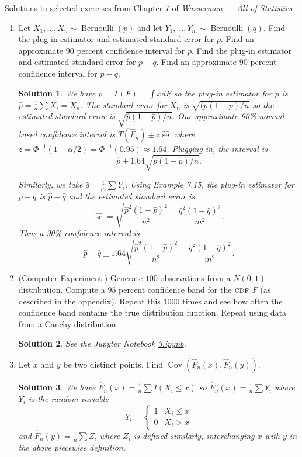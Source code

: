 \documentclass[10pt]{article}
\newtheorem*{sol}{Solution}
\newcommand{\Bern}{\operatorname{Bernoulli}}
\newcommand{\se}{\operatorname{se}}
\newcommand{\Cov}{\operatorname{Cov}}
\newcommand{\CDF}{\textsc{cdf}}
\begin{document}
\noindent \large{Solutions to selected exercises from Chapter 7 of
\emph{Wasserman --- All of Statistics}}

\begin{enumerate}
\item[(2)] Let $X_1,\ldots,X_n \sim \Bern(p)$ and let
$Y_1, \ldots, Y_m \sim \Bern(q)$. Find
the plug-in estimator and estimated standard error for $p$. Find an approximate
90 percent confidence interval for $p$. Find the plug-in estimator
and estimated standard error for $p - q$. Find an approximate 90
percent confidence interval for $p - q$.

\begin{sol}
We have $p=T(F)=\int xdF$ so the plug-in estimator for $p$ is
$\hat{p}=\frac{1}{n}\sum X_i = \overline{X_n}$. The standard error for
$\overline{X_n}$ is $\sqrt{(p(1-p)/n}$ so the estimated standard error is
$\sqrt{\hat p(1-\hat p)/n}$. Our approximate 90\% normal-based
confidence interval is $T(\widehat F_n) \pm z \widehat{\se}$ where
$z=\Phi^{-1}(1-\alpha/2)=\Phi^{-1}(0.95) \approx 1.64$. Plugging in,
the interval is
\[
\hat p \pm 1.64 \sqrt{\hat p(1-\hat p)/n}.
\]

Similarly, we take $\hat q = \frac{1}{m}\sum Y_i$. Using Example 7.15, the plug-in
estimator for $p-q$ is $\hat p - \hat q$ and the estimated standard error is
\[
\widehat{\se} =
\sqrt{\frac{\hat p^2(1-\hat p)^2}{n^2} + \frac{\hat q^2(1-\hat q)^2}{m^2}}.
\]
Thus a 90\% confidence interval is
\[
\hat p - \hat q \pm
1.64\sqrt{\frac{\hat p^2(1-\hat p)^2}{n^2} + \frac{\hat q^2(1-\hat q)^2}{m^2}}.
\]
\end{sol}

\item[(3)]
(Computer Experiment.) Generate $100$ observations from a $N(0,1)$ distribution.
Compute a $95$ percent confidence band for the $\CDF$ $F$ (as
described in the appendix). Repeat this $1000$ times and see how often
the confidence band contains the true distribution function. Repeat using
data from a Cauchy distribution.

\begin{sol}
See the Jupyter Notebook
\href{https://github.com/ajrasmus/some_of_statistics/blob/main/chapter_7/3.ipynb}{3.ipynb}.
\end{sol}

\item[(5)]
Let $x$ and $y$ be two distinct points. Find
$\Cov(\hat F_n(x), \hat F_n(y))$.

\begin{sol}
We have $\hat F_n(x) = \frac{1}{n} \sum I(X_i \leq x)$ so $\hat F_n(x) =
\frac{1}{n} \sum Y_i$ where $Y_i$ is the random variable
\[
Y_i = \begin{cases}
1 & X_i \leq x \\
0 & X_i > x
\end{cases}
\]
and $\hat F_n(y)=\frac{1}{n} \sum Z_i$ where $Z_i$ is defined similarly,
interchanging $x$ with $y$ in the above piecewise definition.


\end{sol}
\end{enumerate}
\end{document}

